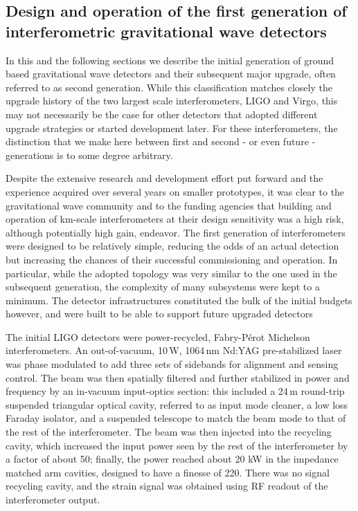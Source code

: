 \subsection{Design and operation of the first generation of interferometric gravitational wave detectors}\label{subsec:1stgen}
In this and the following sections we describe the initial generation of ground based gravitational wave detectors and their subsequent major upgrade, often referred to as second generation. While this classification matches closely the upgrade history of the two largest scale interferometers, LIGO and Virgo, this may not necessarily be the case for other detectors that adopted different upgrade strategies or started development later. For these interferometers, the distinction that we make here between first and second - or even future - generations is to some degree arbitrary.


Despite the extensive research and development effort put forward and the experience acquired over several years on smaller prototypes, it was clear to the gravitational wave community and to the funding agencies that building and operation of km-scale interferometers at their design sensitivity was a high risk, although potentially high gain, endeavor.
The first generation of interferometers were designed to be relatively simple, reducing the odds of an actual detection but increasing the chances of their successful commissioning and operation.
In particular, while the adopted topology was very similar to the one used in the subsequent generation, the complexity of many subsystems were kept to a minimum.
The detector infrastructures constituted the bulk of the initial budgets however, and were built to be able to support future upgraded detectors

The initial LIGO detectors\cite{Abbott_2004,Abbott_2009} were power-recycled, Fabry-P\'{e}rot Michelson interferometers.
An out-of-vacuum, 10\,W, 1064\,nm Nd:YAG pre-stabilized laser was phase modulated to add three sets of sidebands for alignment and sensing control.
The beam was then spatially filtered and further stabilized in power and frequency by an in-vacuum input-optics section: this included a 24\,m round-trip suspended triangular optical cavity, referred to as input mode cleaner, a low loss Faraday isolator, and a suspended telescope to match the beam mode to that of the rest of the interferometer.
The beam was then injected into the recycling cavity,
which increased the input power seen by the rest of the interferometer by a factor of about 50; finally, the power reached about 20 kW in the impedance matched arm cavities, designed to have a finesse of 220. There was no signal recycling cavity, and the strain signal was obtained using RF readout of the interferometer output.

